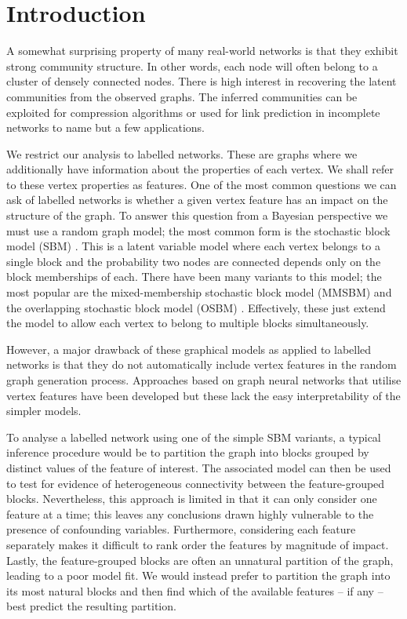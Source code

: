 \section{Introduction}

A somewhat surprising property of many real-world networks is that they exhibit strong community structure. In other words, each node will often belong to a cluster of densely connected nodes. There is high interest in recovering the latent communities from the observed graphs. The inferred communities can be exploited for compression algorithms \cite{cluster-compression} or used for link prediction in incomplete networks \cite{link-prediction} to name but a few applications.

We restrict our analysis to labelled networks. These are graphs where we additionally have information about the properties of each vertex. We shall refer to these vertex properties as features. One of the most common questions we can ask of labelled networks is whether a given vertex feature has an impact on the structure of the graph. To answer this question from a Bayesian perspective we must use a random graph model; the most common form is the stochastic block model (SBM) \cite{vanilla-sbm}. This is a latent variable model where each vertex belongs to a single block and the probability two nodes are connected depends only on the block memberships of each. There have been many variants to this model; the most popular are the mixed-membership stochastic block model (MMSBM) \cite{mixed-membership-sbm} and the overlapping stochastic block model (OSBM) \cite{overlapping-sbm}. Effectively, these just extend the model to allow each vertex to belong to multiple blocks simultaneously.

However, a major drawback of these graphical models as applied to labelled networks is that they do not automatically include vertex features in the random graph generation process. Approaches based on graph neural networks \cite{sbm-gnn} that utilise vertex features have been developed but these lack the easy interpretability of the simpler models.

To analyse a labelled network using one of the simple SBM variants, a typical inference procedure would be to partition the graph into blocks grouped by distinct values of the feature of interest. The associated model can then be used to test for evidence of heterogeneous connectivity between the feature-grouped blocks. Nevertheless, this approach is limited in that it can only consider one feature at a time; this leaves any conclusions drawn highly vulnerable to the presence of confounding variables. Furthermore, considering each feature separately makes it difficult to rank order the features by  magnitude of impact. Lastly, the feature-grouped blocks are often an unnatural partition of the graph, leading to a poor model fit. We would instead prefer to partition the graph into its most natural blocks and then find which of the available features -- if any -- best predict the resulting partition.

